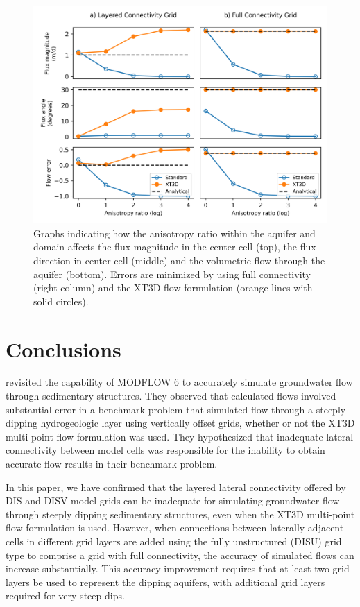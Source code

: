 \documentclass{article}
\begin{document}
\begin{figure}
	\begin{center}
	\includegraphics[scale=0.9]{../figures/fig5_paper.png}
	\caption{Graphs indicating how the anisotropy ratio within the aquifer and domain affects the flux magnitude in the center cell (top), the flux direction in center cell (middle) and the volumetric flow through the aquifer (bottom). Errors are minimized by using full connectivity (right column) and the XT3D flow formulation (orange lines with solid circles).}
	\label{fig:fig5}
	\end{center}
\end{figure}

\section*{Conclusions}

\cite{bardot2023} revisited the capability of MODFLOW 6 to accurately simulate groundwater flow through sedimentary structures. They observed that calculated flows involved substantial error in a benchmark problem that simulated flow through a steeply dipping hydrogeologic layer using vertically offset grids, whether or not the XT3D multi-point flow formulation was used. They hypothesized that inadequate lateral connectivity between model cells was responsible for the inability to obtain accurate flow results in their benchmark problem.

In this paper, we have confirmed that the layered lateral connectivity offered by DIS and DISV model grids can be inadequate for simulating groundwater flow through steeply dipping sedimentary structures, even when the XT3D multi-point flow formulation is used.  However, when connections between laterally adjacent cells in different grid layers are added using the fully unstructured (DISU) grid type to comprise a grid with full connectivity, the accuracy of simulated flows can increase substantially. This accuracy improvement requires that at least two grid layers be used to represent the dipping aquifers, with additional grid layers required for very steep dips.
\end{document}
